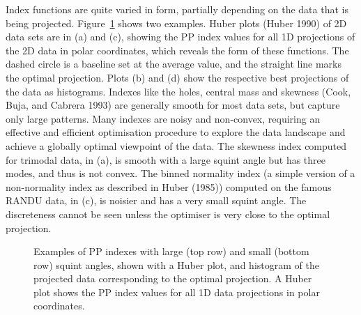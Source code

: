 \documentclass[
  12pt,
]{interact}
\theoremstyle{plain}
\begin{document}
Index functions are quite varied in form, partially depending on the
data that is being projected. Figure~\ref{fig-example-functions} shows
two examples. Huber plots (Huber 1990) of 2D data sets are in (a) and
(c), showing the PP index values for all 1D projections of the 2D data
in polar coordinates, which reveals the form of these functions. The
dashed circle is a baseline set at the average value, and the straight
line marks the optimal projection. Plots (b) and (d) show the respective
best projections of the data as histograms. Indexes like the holes,
central mass and skewness (Cook, Buja, and Cabrera 1993) are generally
smooth for most data sets, but capture only large patterns. Many indexes
are noisy and non-convex, requiring an effective and efficient
optimisation procedure to explore the data landscape and achieve a
globally optimal viewpoint of the data. The skewness index computed for
trimodal data, in (a), is smooth with a large squint angle but has three
modes, and thus is not convex. The binned normality index (a simple
version of a non-normality index as described in Huber (1985)) computed
on the famous RANDU data, in (c), is noisier and has a very small squint
angle. The discreteness cannot be seen unless the optimiser is very
close to the optimal projection.

\begin{figure}


\caption{\label{fig-example-functions}Examples of PP indexes with large
(top row) and small (bottom row) squint angles, shown with a Huber plot,
and histogram of the projected data corresponding to the optimal
projection. A Huber plot shows the PP index values for all 1D data
projections in polar coordinates.}

\end{figure}%
\end{document}
